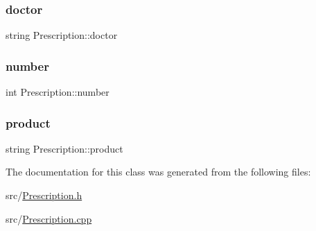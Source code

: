 \subsubsection{\texorpdfstring{doctor}{doctor}}
{\footnotesize\ttfamily string Prescription\+::doctor\hspace{0.3cm}{\ttfamily [private]}}

\mbox{\label{classPrescription_a4b3dcfe55dff479143e63cf7778ffa12}} 
\subsubsection{\texorpdfstring{number}{number}}
{\footnotesize\ttfamily int Prescription\+::number\hspace{0.3cm}{\ttfamily [private]}}

\mbox{\label{classPrescription_ab9556fbe876105624867e2f360617688}} 
\subsubsection{\texorpdfstring{product}{product}}
{\footnotesize\ttfamily string Prescription\+::product\hspace{0.3cm}{\ttfamily [private]}}



The documentation for this class was generated from the following files\+:\begin{DoxyCompactItemize}
\item 
src/\hyperlink{Prescription_8h}{Prescription.\+h}\item 
src/\hyperlink{Prescription_8cpp}{Prescription.\+cpp}\end{DoxyCompactItemize}
